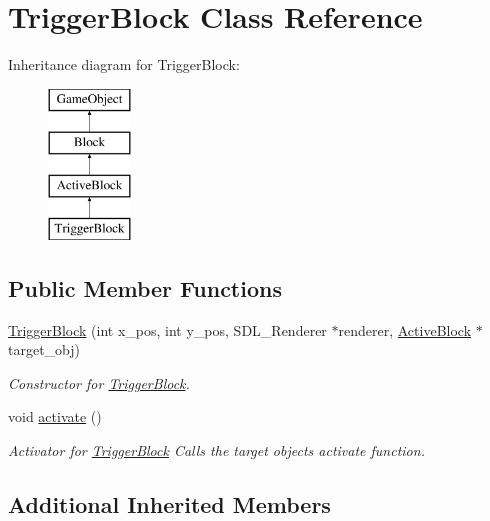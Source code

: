 \hypertarget{class_trigger_block}{}\section{Trigger\+Block Class Reference}
\label{class_trigger_block}
Inheritance diagram for Trigger\+Block\+:\begin{figure}[H]
\begin{center}
\leavevmode
\includegraphics[height=4.000000cm]{class_trigger_block}
\end{center}
\end{figure}
\subsection*{Public Member Functions}
\begin{DoxyCompactItemize}
\item 
\hyperlink{class_trigger_block_ab80e0e8f0ab696180a40d343aa2c7788}{Trigger\+Block} (int x\+\_\+pos, int y\+\_\+pos, S\+D\+L\+\_\+\+Renderer $\ast$renderer, \hyperlink{class_active_block}{Active\+Block} $\ast$target\+\_\+obj)
\begin{DoxyCompactList}\small\item\em Constructor for \hyperlink{class_trigger_block}{Trigger\+Block}. \end{DoxyCompactList}\item 
\hypertarget{class_trigger_block_afe2b4404380a69686dee246083cd0447}{}void \hyperlink{class_trigger_block_afe2b4404380a69686dee246083cd0447}{activate} ()\label{class_trigger_block_afe2b4404380a69686dee246083cd0447}

\begin{DoxyCompactList}\small\item\em Activator for \hyperlink{class_trigger_block}{Trigger\+Block} Calls the target objects activate function. \end{DoxyCompactList}\end{DoxyCompactItemize}
\subsection*{Additional Inherited Members}


